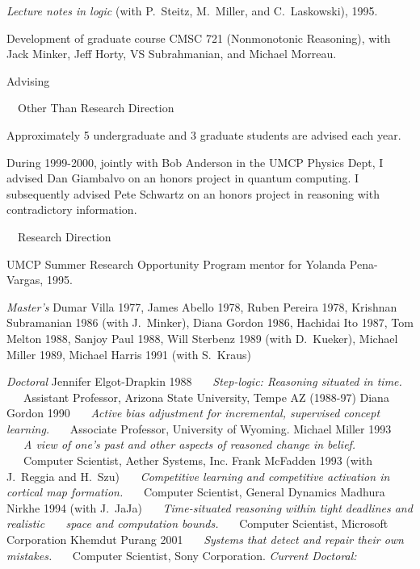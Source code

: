 {\paper
{\sl Lecture notes in logic} 
(with P.~Steitz, M.~Miller, and C.~Laskowski), 1995.

\paper
Development of graduate course CMSC 721 (Nonmonotonic Reasoning),
with Jack Minker, Jeff Horty, VS Subrahmanian, and Michael Morreau.


\subsec Advising

\bigskip

\subsubsec ~~Other Than Research Direction

\medskip
\noindent Approximately 5 undergraduate and 3 graduate students
are advised each year.

During 1999-2000, jointly with Bob Anderson in the UMCP Physics Dept,
I advised Dan Giambalvo on an honors project in quantum
computing.  I subsequently
advised Pete Schwartz on an honors project in reasoning with
contradictory information.


\bigskip

\subsubsec ~~Research Direction

\bigskip
\noindent
UMCP Summer Research Opportunity Program mentor for Yolanda
Pena-Vargas, 1995.

\medskip
\noindent
{\sl Master's}
\smallskip
\noindent
Dumar Villa 1977, James Abello 1978, Ruben Pereira 1978, Krishnan Subramanian 1986 (with J.~Minker),
Diana Gordon 1986,
Hachidai Ito 1987,
Tom Melton 1988,
Sanjoy Paul 1988,
Will Sterbenz 1989 (with D.~Kueker),
Michael Miller 1989,
Michael Harris 1991 (with S.~Kraus)


{\obeylines\parindent=0pt
\medskip
{\sl Doctoral}
\smallskip
Jennifer Elgot-Drapkin 1988
~~~{\sl Step-logic: Reasoning situated in time.}
~~~Assistant Professor, Arizona State University, Tempe AZ (1988-97)
\smallskip
Diana Gordon 1990 
~~~{\sl Active bias adjustment for incremental, supervised concept learning.}
~~~Associate Professor, University of Wyoming.
\smallskip
Michael Miller 1993
~~~{\sl A view of one's past and other aspects of reasoned change in belief.}
~~~Computer Scientist, Aether Systems, Inc.
\smallskip
Frank McFadden 1993 (with J.~Reggia and H.~Szu)
~~~{\sl Competitive learning and competitive activation in cortical map formation.}
~~~Computer Scientist, General Dynamics
\smallskip
Madhura Nirkhe 1994 (with J.~JaJa)
~~~{\sl Time-situated reasoning within tight deadlines and realistic
~~~space and computation bounds.}
~~~Computer Scientist, Microsoft Corporation
\smallskip
Khemdut Purang 2001
~~~{\sl Systems that detect and repair their own mistakes.}
~~~Computer Scientist, Sony Corporation.
\eject
{\sl Current Doctoral: }
\bigskip


}}
